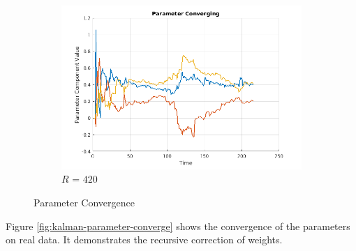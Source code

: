 \documentclass[11pt, fleqn]{article}
\begin{document}
\begin{figure}[!h]
\begin{subfigure}[b]{0.3\textwidth}
        \includegraphics[width=\textwidth]{kalman-parameter-converge-r-420.png}
		\caption{$R$ = $420$}
		\label{fig:kalman-parameter-converge-r-420}
    \end{subfigure}
    \caption{Parameter Convergence}
	\label{fig:o-alpha-error}
\end{figure}

Figure \ref{fig:kalman-parameter-converge} shows the convergence of the parameters on real data. It demonstrates the recursive correction of weights.\\
\end{document}
